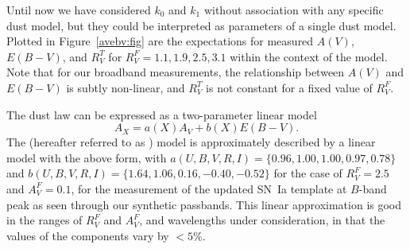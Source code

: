 \documentclass{aastex61}   	%
\begin{document}
Until now we have considered $k_0$ and $k_1$ without association with any specific dust model, but they could be interpreted as
parameters of a single  dust model.
\color{red}
Plotted in Figure~\ref{avebv:fig} are the expectations for measured $A(V)$, $E(B-V)$, and $R^T_V$ for $R^F_V=1.1, 1.9, 2.5, 3.1$
within the context of the  model.
Note that for our broadband measurements, the relationship between $A(V)$ and $E(B-V)$ is subtly
non-linear, and $R^T_V$ is not constant for a fixed value of $R^F_V$.
\color{black}

The \citet{1989ApJ...345..245C} dust law can be expressed as a two-parameter linear model
\begin{equation}
A_X = a(X)  A_V + b(X) E(B-V).
\end{equation}
The \citet{1999PASP..111...63F} (hereafter referred to as ) model is approximately described by a linear model with
the above form, with
$a(U,B,V,R,I)=\{0.96,   1.00,   1.00,   0.97,   0.78\}$ and $b(U,B,V,R,I)=\{  1.64,   1.06,   0.16,  -0.40,  -0.52\}$ for the case of
$R^F_V=2.5$
\color{red}
and $A^F_V=0.1$,
for the measurement of the updated
\citet{2007ApJ...663.1187H} SN~Ia template at $B$-band peak as seen through our synthetic passbands.
\color{black}
This linear approximation
is good in the ranges of
\color{red}
 $R^F_V$ and $A^F_V$,
\color{black}
and wavelengths under consideration, in that the values of the components  vary by $<5$\%.
\end{document}
